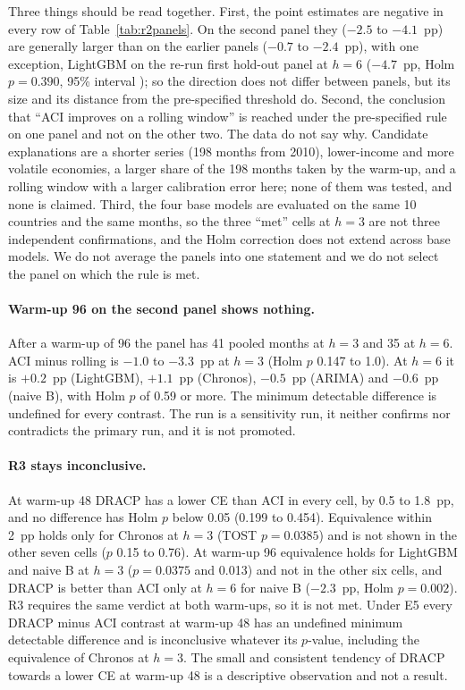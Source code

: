 Three things should be read together. First, the point estimates are negative in every row of Table~\ref{tab:r2panels}. On the second panel they ($-2.5$ to $-4.1$~pp) are generally larger than on the earlier panels ($-0.7$ to $-2.4$~pp), with one exception, LightGBM on the re-run first hold-out panel at $h=6$ ($-4.7$~pp, Holm $p=0.390$, 95\% interval ); so the direction does not differ between panels, but its size and its distance from the pre-specified threshold do. Second, the conclusion that ``ACI improves on a rolling window'' is reached under the pre-specified rule on one panel and not on the other two. The data do not say why. Candidate explanations are a shorter series (198 months from 2010), lower-income and more volatile economies, a larger share of the 198 months taken by the warm-up, and a rolling window with a larger calibration error here; none of them was tested, and none is claimed. Third, the four base models are evaluated on the same 10 countries and the same months, so the three ``met'' cells at $h=3$ are not three independent confirmations, and the Holm correction does not extend across base models. We do not average the panels into one statement and we do not select the panel on which the rule is met.

\paragraph{Warm-up 96 on the second panel shows nothing.} After a warm-up of 96 the panel has 41 pooled months at $h=3$ and 35 at $h=6$. ACI minus rolling is $-1.0$ to $-3.3$~pp at $h=3$ (Holm $p$ 0.147 to 1.0). At $h=6$ it is $+0.2$~pp (LightGBM), $+1.1$~pp (Chronos), $-0.5$~pp (ARIMA) and $-0.6$~pp (naive B), with Holm $p$ of 0.59 or more. The minimum detectable difference is undefined for every contrast. The run is a sensitivity run, it neither confirms nor contradicts the primary run, and it is not promoted.

\paragraph{R3 stays inconclusive.} At warm-up 48 DRACP has a lower CE than ACI in every cell, by 0.5 to 1.8~pp, and no difference has Holm $p$ below 0.05 (0.199 to 0.454). Equivalence within 2~pp holds only for Chronos at $h=3$ (TOST $p=0.0385$) and is not shown in the other seven cells ($p$ 0.15 to 0.76). At warm-up 96 equivalence holds for LightGBM and naive B at $h=3$ ($p=0.0375$ and 0.013) and not in the other six cells, and DRACP is better than ACI only at $h=6$ for naive B ($-2.3$~pp, Holm $p=0.002$). R3 requires the same verdict at both warm-ups, so it is not met. Under E5 every DRACP minus ACI contrast at warm-up 48 has an undefined minimum detectable difference and is inconclusive whatever its $p$-value, including the equivalence of Chronos at $h=3$. The small and consistent tendency of DRACP towards a lower CE at warm-up 48 is a descriptive observation and not a result.

